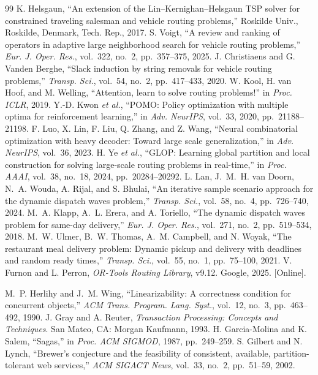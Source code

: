 \documentclass[10pt,twocolumn,letterpaper]{article}
\theoremstyle{definition}
\begin{document}
\begin{thebibliography}{99}
 K. Helsgaun, ``An extension of the Lin--Kernighan--Helsgaun TSP solver for constrained traveling salesman and vehicle routing problems,'' Roskilde Univ., Roskilde, Denmark, Tech. Rep., 2017.
 S. Voigt, ``A review and ranking of operators in adaptive large neighborhood search for vehicle routing problems,'' \emph{Eur. J. Oper. Res.}, vol.~322, no.~2, pp.~357--375, 2025.
 J. Christiaens and G. Vanden Berghe, ``Slack induction by string removals for vehicle routing problems,'' \emph{Transp. Sci.}, vol.~54, no.~2, pp.~417--433, 2020.
 W. Kool, H. van Hoof, and M. Welling, ``Attention, learn to solve routing problems!'' in \emph{Proc. ICLR}, 2019.
 Y.-D. Kwon \emph{et al.}, ``POMO: Policy optimization with multiple optima for reinforcement learning,'' in \emph{Adv. NeurIPS}, vol.~33, 2020, pp.~21188--21198.
 F. Luo, X. Lin, F. Liu, Q. Zhang, and Z. Wang, ``Neural combinatorial optimization with heavy decoder: Toward large scale generalization,'' in \emph{Adv. NeurIPS}, vol.~36, 2023.
 H. Ye \emph{et al.}, ``GLOP: Learning global partition and local construction for solving large-scale routing problems in real-time,'' in \emph{Proc. AAAI}, vol.~38, no.~18, 2024, pp.~20284--20292.
 L. Lan, J.~M.~H. van Doorn, N.~A. Wouda, A. Rijal, and S. Bhulai, ``An iterative sample scenario approach for the dynamic dispatch waves problem,'' \emph{Transp. Sci.}, vol.~58, no.~4, pp.~726--740, 2024.
 M.~A. Klapp, A.~L. Erera, and A. Toriello, ``The dynamic dispatch waves problem for same-day delivery,'' \emph{Eur. J. Oper. Res.}, vol.~271, no.~2, pp.~519--534, 2018.
 M.~W. Ulmer, B.~W. Thomas, A.~M. Campbell, and N. Woyak, ``The restaurant meal delivery problem: Dynamic pickup and delivery with deadlines and random ready times,'' \emph{Transp. Sci.}, vol.~55, no.~1, pp.~75--100, 2021.
 V. Furnon and L. Perron, \emph{OR-Tools Routing Library}, v9.12. Google, 2025. [Online].

 M.~P. Herlihy and J.~M. Wing, ``Linearizability: A correctness condition for concurrent objects,'' \emph{ACM Trans. Program. Lang. Syst.}, vol.~12, no.~3, pp.~463--492, 1990.
 J. Gray and A. Reuter, \emph{Transaction Processing: Concepts and Techniques}. San Mateo, CA: Morgan Kaufmann, 1993.
 H. Garcia-Molina and K. Salem, ``Sagas,'' in \emph{Proc. ACM SIGMOD}, 1987, pp.~249--259.
 S. Gilbert and N. Lynch, ``Brewer's conjecture and the feasibility of consistent, available, partition-tolerant web services,'' \emph{ACM SIGACT News}, vol.~33, no.~2, pp.~51--59, 2002.


\end{thebibliography}
\end{document}
